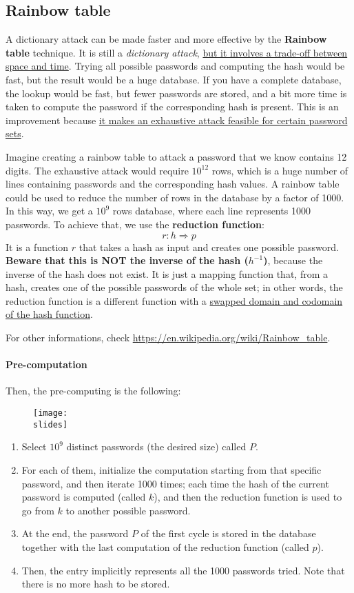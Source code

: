 \subsection{Rainbow table}
A dictionary attack can be made faster and more effective by the \textbf{Rainbow table} technique. It is still a \textit{dictionary attack}, \ul{but it involves a trade-off between space and time}. Trying all possible passwords and computing the hash would be fast, but the result would be a huge database. If you have a complete database, the lookup would be fast, but fewer passwords are stored, and a bit more time is taken to compute the password if the corresponding hash is present. This is an improvement because \ul{it makes an exhaustive attack feasible for certain password sets}.

Imagine creating a rainbow table to attack a password that we know contains 12 digits.
The exhaustive attack would require $10^{12}$ rows, which is a huge number of lines containing passwords and the corresponding hash values.
A rainbow table could be used to reduce the number of rows in the database by a factor of 1000. In this way, we get a $10^9$ rows database, where each line represents 1000 passwords. To achieve that, we use the \textbf{reduction function}:
\[
  r: h \Rightarrow p
\]
It is a function $r$ that takes a hash as input and creates one possible password. \textbf{Beware that this is NOT the inverse of the hash ($h^{-1}$)}, because the inverse of the hash does not exist. It is just a mapping function that, from a hash, creates one of the possible passwords of the whole set; in other words, the reduction function is a different function with a \ul{swapped domain and codomain of the hash function}.

For other informations, check \url{https://en.wikipedia.org/wiki/Rainbow_table}.

\paragraph{Pre-computation}
Then, the pre-computing is the following:

\begin{figure}[h]
  \centering
  \texttt{[image: \\slides]}
\end{figure}

\begin{enumerate}
  \item Select $10^9$ distinct passwords (the desired size) called $P$.
  \item For each of them, initialize the computation starting from that specific password, and then iterate 1000 times; each time the hash of the current password is computed (called $k$), and then the reduction function is used to go from $k$ to another possible password.
  \item At the end, the password $P$ of the first cycle is stored in the database together with the last computation of the reduction function (called $p$).
  \item Then, the entry implicitly represents all the 1000 passwords tried. Note that there is no more hash to be stored.
\end{enumerate}


